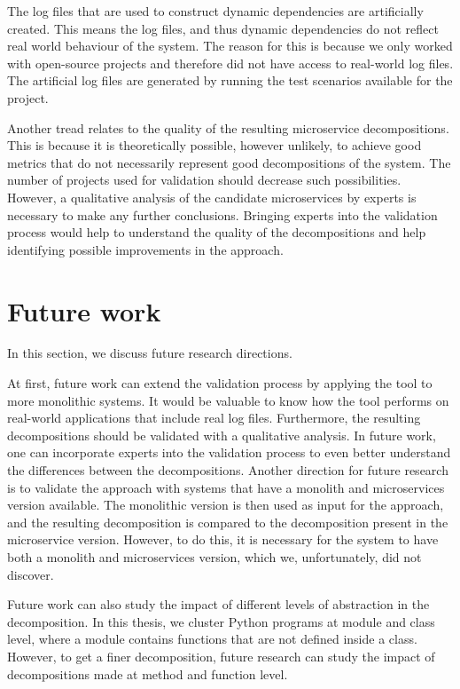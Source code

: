 The log files that are used to construct dynamic dependencies are artificially created. This means the log files, and thus dynamic dependencies do not reflect real world behaviour of the system. The reason for this is because we only worked with open-source projects and therefore did not have access to real-world log files. The artificial log files are generated by running the test scenarios available for the project. \par

Another tread relates to the quality of the resulting microservice decompositions. This is because it is theoretically possible, however unlikely, to achieve good metrics that do not necessarily represent good decompositions of the system. The number of projects used for validation should decrease such possibilities. However, a qualitative analysis of the candidate microservices by experts is necessary to make any further conclusions. Bringing experts into the validation process would help to understand the quality of the decompositions and help identifying possible improvements in the approach.

\section{Future work}
In this section, we discuss future research directions. \par

At first, future work can extend the validation process by applying the tool to more monolithic systems. It would be valuable to know how the tool performs on real-world applications that include real log files. Furthermore, the resulting decompositions should be validated with a qualitative analysis. In future work, one can incorporate experts into the validation process to even better understand the differences between the decompositions. Another direction for future research is to validate the approach with systems that have a monolith and microservices version available. The monolithic version is then used as input for the approach, and the resulting decomposition is compared to the decomposition present in the microservice version. However, to do this, it is necessary for the system to have both a monolith and microservices version, which we, unfortunately, did not discover. \par

Future work can also study the impact of different levels of abstraction in the decomposition. In this thesis, we cluster Python programs at module and class level, where a module contains functions that are not defined inside a class. However, to get a finer decomposition, future research can study the impact of decompositions made at method and function level. \par

